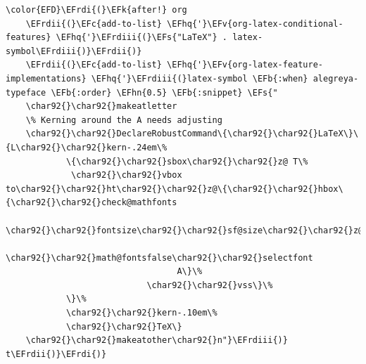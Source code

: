 \documentclass{scrartcl}
\newcommand{\EFk}[1]{\textcolor{EFk}{#1}} %
\newcommand{\EFs}[1]{\textcolor{EFs}{#1}} %
\newcommand{\EFb}[1]{\textcolor{EFb}{#1}} %
\newcommand{\EFc}[1]{\textcolor{EFc}{#1}} %
\newcommand{\EFv}[1]{\textcolor{EFv}{#1}} %
\newcommand{\EFhn}[1]{\textcolor{EFhn}{\textbf{#1}}} %
\newcommand{\EFhq}[1]{\textcolor{EFhq}{#1}} %
\newcommand{\EFrdi}[1]{\textcolor{EFrdi}{#1}} %
\newcommand{\EFrdii}[1]{\textcolor{EFrdii}{#1}} %
\newcommand{\EFrdiii}[1]{\textcolor{EFrdiii}{#1}} %
\begin{document}
\begin{Code}
\begin{Verbatim}[]
\color{EFD}\EFrdi{(}\EFk{after!} org
	\EFrdii{(}\EFc{add-to-list} \EFhq{'}\EFv{org-latex-conditional-features} \EFhq{'}\EFrdiii{(}\EFs{"LaTeX"} . latex-symbol\EFrdiii{)}\EFrdii{)}
	\EFrdii{(}\EFc{add-to-list} \EFhq{'}\EFv{org-latex-feature-implementations} \EFhq{'}\EFrdiii{(}latex-symbol \EFb{:when} alegreya-typeface \EFb{:order} \EFhn{0.5} \EFb{:snippet} \EFs{"
	\char92{}\char92{}makeatletter
	\% Kerning around the A needs adjusting
	\char92{}\char92{}DeclareRobustCommand\{\char92{}\char92{}LaTeX\}\{L\char92{}\char92{}kern-.24em\%
	        \{\char92{}\char92{}sbox\char92{}\char92{}z@ T\%
	         \char92{}\char92{}vbox to\char92{}\char92{}ht\char92{}\char92{}z@\{\char92{}\char92{}hbox\{\char92{}\char92{}check@mathfonts
	                              \char92{}\char92{}fontsize\char92{}\char92{}sf@size\char92{}\char92{}z@
	                              \char92{}\char92{}math@fontsfalse\char92{}\char92{}selectfont
	                              A\}\%
	                        \char92{}\char92{}vss\}\%
	        \}\%
	        \char92{}\char92{}kern-.10em\%
	        \char92{}\char92{}TeX\}
	\char92{}\char92{}makeatother\char92{}n"}\EFrdiii{)} t\EFrdii{)}\EFrdi{)}
\end{Verbatim}
\end{Code}
\end{document}
